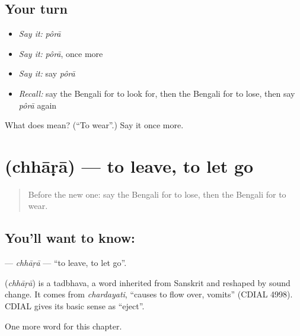 \subsection*{Your turn}
\begin{itemize}
\raggedright
  \item \emph{Say it:} \emph{pôrā}
  \item \emph{Say it:} \emph{pôrā}, once more
  \item \emph{Say it:} say \emph{pôrā}
  \item \emph{Recall:} say the Bengali for to look for, then the Bengali for to lose, then say \emph{pôrā} again
\end{itemize}

\begin{tcolorbox}[breakable,colback=teal!4,colframe=teal!35!black,title={Before you move on}]
What does  mean? (\textquotedblleft{}To wear\textquotedblright{}.) Say it once more.
\end{tcolorbox}
\section[\texorpdfstring{\bn{ছাড়া} (chhāṛā)}{ছাড়া (chhāṛā)}]{ (chhāṛā) — to leave, to let go}

\label{lesson:BN-C53-chhara}



\begin{quote}
Before the new one: say the Bengali for to lose, then the Bengali for to wear.
\end{quote}

\subsection*{You'll want to know: }
\textbf{} — \emph{chhāṛā} — \textquotedblleft{}to leave, to let go\textquotedblright{}.

\begin{cousinweb}
\textbf{} (\emph{chhāṛā}) is a tadbhava, a word inherited from Sanskrit and reshaped by sound change. It comes from \emph{chardayati}, \textquotedblleft{}causes to flow over, vomits\textquotedblright{} (CDIAL 4998). CDIAL gives its basic sense as \textquotedblleft{}eject\textquotedblright{}.
\end{cousinweb}

\begin{grammarlens}[title={What you've built}]
One more word for this chapter.
\end{grammarlens}

